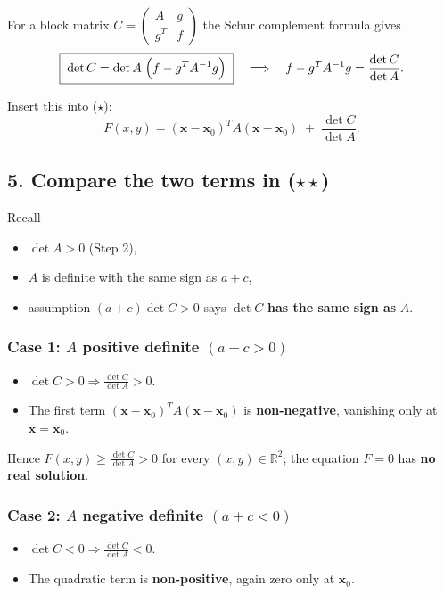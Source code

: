 For a block matrix
$C=\begin{pmatrix}A & g \\ g^{T} & f\end{pmatrix}$
the Schur complement formula gives
\[
\boxed{\; \det C =\det A\;\Bigl(f-g^{T}A^{-1}g\Bigr) \;} \quad\Longrightarrow\quad f-g^{T}A^{-1}g=\frac{\det C}{\det A}.
\]

Insert this into ($\star$):
\[
F(x,y)=
(\mathbf{x}-\mathbf{x}_{0})^{\!T}A(\mathbf{x}-\mathbf{x}_{0})
\;+\;\frac{\det C}{\det A}.
\tag{$\star\star$}
\]

\subsection*{5. Compare the two terms in ($\star\star$)}

Recall
\begin{itemize}
\item $\det A>0$ (Step 2),
\item $A$ is definite with the same sign as $a+c$,
\item assumption $(a+c)\det C>0$ says $\det C$ \textbf{has the same sign as} $A$.
\end{itemize}

\subsubsection*{Case 1: $A$ positive definite $(a+c>0)$}
\begin{itemize}
\item $\det C>0 \Rightarrow \frac{\det C}{\det A}>0$.
\item The first term $(\mathbf{x}-\mathbf{x}_{0})^{T}A(\mathbf{x}-\mathbf{x}_{0})$ is \textbf{non-negative}, vanishing only at $\mathbf{x}=\mathbf{x}_{0}$.
\end{itemize}

Hence $F(x,y)\ge\frac{\det C}{\det A}>0$ for every $(x,y)\in\mathbb{R}^{2}$; the equation $F=0$ has \textbf{no real solution}.

\subsubsection*{Case 2: $A$ negative definite $(a+c<0)$}
\begin{itemize}
\item $\det C<0 \Rightarrow \frac{\det C}{\det A}<0$.
\item The quadratic term is \textbf{non-positive}, again zero only at $\mathbf{x}_{0}$.
\end{itemize}

